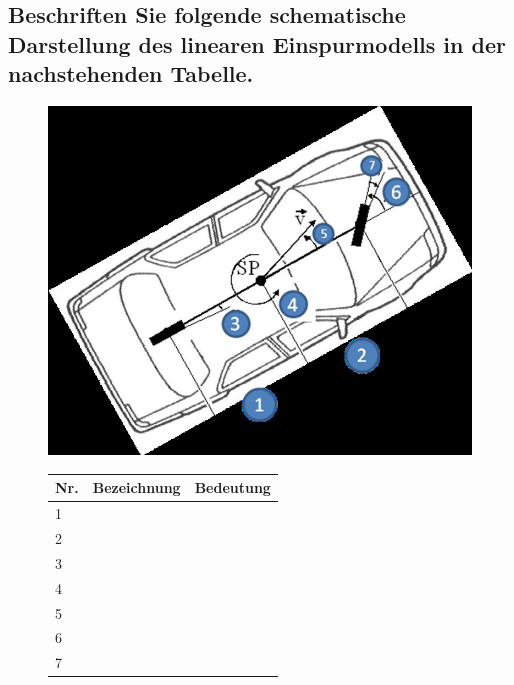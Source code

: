 \subsection{Beschriften Sie folgende schematische Darstellung des linearen Einspurmodells in der nachstehenden Tabelle.}
\begin{figure}[H]
    \begin{minipage}[c]{.45\linewidth}
        \includegraphics[width=\linewidth]{Graphics/Linearen_Einspurmodell.png}
    \end{minipage}
    \begin{minipage}[c]{.45\linewidth}
        \begin{tabular}{|p{.2\linewidth}|p{.4\linewidth}|p{.4\linewidth}|}
            \hline
            Nr.&Bezeichnung&Bedeutung\\
            \hline
            1& & \\
            \hline
            2& & \\
            \hline
            3& & \\
            \hline
            4& & \\
            \hline
            5& & \\
            \hline
            6& & \\
            \hline
            7& & \\
            \hline
        \end{tabular}
    \end{minipage}
\end{figure}
